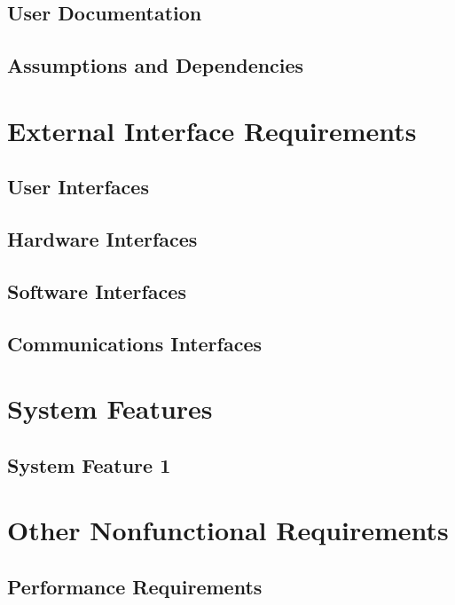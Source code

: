 \section{User Documentation}

\section{Assumptions and Dependencies}

\newpage




\chapter{External Interface Requirements}
\label{External Interface Requirements}

\section{User Interfaces}
\section{Hardware Interfaces}
\section{Software Interfaces}
\section{Communications Interfaces}


\chapter{System Features}
\label{System Features}

\section{System Feature 1}


\chapter{Other Nonfunctional Requirements}
\label{Other Nonfunctional Requirements}

\section{Performance Requirements}
